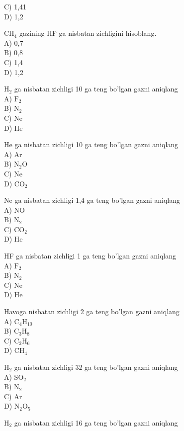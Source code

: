 C) 1,41\\
D) 1,2
  \item $\mathrm{CH}_{4}$ gazining HF ga nisbatan zichligini hisoblang.\\
A) 0,7\\
B) 0,8\\
C) 1,4\\
D) 1,2
  \item $\mathrm{H}_{2}$ ga nisbatan zichligi 10 ga teng bo'lgan gazni aniqlang\\
A) $\mathrm{F}_{2}$\\
B) $\mathrm{N}_{2}$\\
C) Ne\\
D) He\\
  \item He ga nisbatan zichligi 10 ga teng bo'lgan gazni aniqlang\\
A) Ar\\
B) $\mathrm{N}_{2} \mathrm{O}$\\
C) Ne\\
D) $\mathrm{CO}_{2}$
  \item Ne ga nisbatan zichligi 1,4 ga teng bo'lgan gazni aniqlang\\
A) NO\\
B) $\mathrm{N}_{2}$\\
C) $\mathrm{CO}_{2}$\\
D) He
  \item HF ga nisbatan zichligi 1 ga teng bo'lgan gazni aniqlang\\
A) $\mathrm{F}_{2}$\\
B) $\mathrm{N}_{2}$\\
C) Ne\\
D) He
  \item Havoga nisbatan zichligi 2 ga teng bo'lgan gazni aniqlang\\
A) $\mathrm{C}_{4} \mathrm{H}_{10}$\\
B) $\mathrm{C}_{3} \mathrm{H}_{8}$\\
C) $\mathrm{C}_{2} \mathrm{H}_{6}$\\
D) $\mathrm{CH}_{4}$
  \item $\mathrm{H}_{2}$ ga nisbatan zichligi 32 ga teng bo'lgan gazni aniqlang\\
A) $\mathrm{SO}_{2}$\\
B) $\mathrm{N}_{2}$\\
C) Ar\\
D) $\mathrm{N}_{2} \mathrm{O}_{5}$
  \item $\mathrm{H}_{2}$ ga nisbatan zichligi 16 ga teng bo'lgan gazni aniqlang\\
